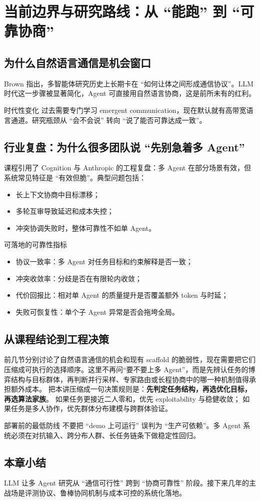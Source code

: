 \section{当前边界与研究路线：从 ``能跑'' 到 ``可靠协商''}

\subsection{为什么自然语言通信是机会窗口}
Brown 指出，多智能体研究历史上长期卡在 ``如何让体之间形成通信协议''。LLM 时代这一步骤被显著简化，Agent 可直接用自然语言协商，这是前所未有的红利。

\begin{importantbox}{时代性变化}
过去需要专门学习 emergent communication，现在默认就有高带宽语言通道。研究瓶颈从 ``会不会说'' 转向 ``说了能否可靠达成一致''。
\end{importantbox}

\subsection{行业复盘：为什么很多团队说 ``先别急着多 Agent''}
课程引用了 Cognition 与 Anthropic 的工程复盘：多 Agent 在部分场景有效，但系统常见特征是 ``有效但脆''。典型问题包括：
\begin{itemize}
    \item 长上下文协商中目标漂移；
    \item 多轮互审导致延迟和成本失控；
    \item 冲突协调失败时，整体可靠性不如单 Agent。
\end{itemize}

\begin{knowledgebox}{可落地的可靠性指标}
\begin{itemize}
    \item 协议一致率：多 Agent 对任务目标和约束解释是否一致；
    \item 冲突收敛率：分歧是否在有限轮内收敛；
    \item 代价回报比：相对单 Agent 的质量提升是否覆盖额外 token 与时延；
    \item 失败可恢复性：单个子 Agent 异常是否会拖垮全局。
\end{itemize}
\end{knowledgebox}

\subsection{从课程结论到工程决策}
前几节分别讨论了自然语言通信的机会和现有 scaffold 的脆弱性，现在需要把它们压缩成可执行的选择顺序。这里不再问“要不要上多 Agent”，而是先辨认任务的博弈结构与目标群体，再判断并行采样、专家路由或长程协商中的哪一种机制值得承担额外成本。
把本讲压缩成一句决策规则是：\textbf{先判定任务结构，再选优化目标，再选算法家族}。
如果任务更接近二人零和，优先 exploitability 与稳健收敛；
如果任务是多人协作，优先群体分布建模与跨群体验证。

\begin{warningbox}{部署前的最低防线}
不要把 ``demo 上可运行'' 误判为 ``生产可依赖''。多 Agent 系统必须在对抗输入、跨分布人群、长任务链条下做稳定性回归。
\end{warningbox}

\subsection{本章小结}
LLM 让多 Agent 研究从 ``通信可行性'' 跨到 ``协商可靠性'' 阶段。接下来几年的主战场是评测协议、鲁棒协同机制与成本可控的系统化落地。

